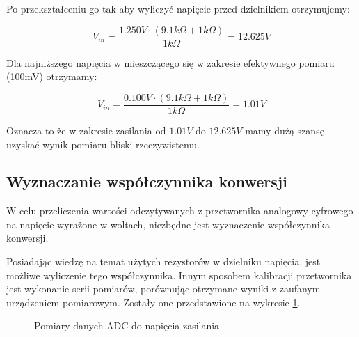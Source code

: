         Po przekształceniu go tak aby wyliczyć napięcie przed dzielnikiem otrzymujemy:
        
        \vspace{1em}
        \begin{displaymath}
         V_{in} = \frac{ 1.250V \cdot (9.1k \Omega  + 1k \Omega)  }{ 1k \Omega  } = 12.625 V
        \end{displaymath}
        \vspace{1em}
        
        Dla najniższego napięcia w mieszczącego się w zakresie efektywnego pomiaru (100mV) otrzymamy:
        
        \vspace{1em}
        \begin{displaymath}
         V_{in} = \frac{ 0.100V \cdot (9.1k \Omega  + 1k \Omega)  }{ 1k \Omega  } = 1.01 V
        \end{displaymath}      
        \vspace{1em}
        
        Oznacza to że w zakresie zasilania od $1.01V$ do $12.625V$ mamy dużą szansę uzyskać wynik pomiaru bliski rzeczywistemu.
        
    \newpage
        
    \subsection{Wyznaczanie współczynnika konwersji}
        W celu przeliczenia wartości odczytywanych z przetwornika analogowy-cyfrowego na napięcie wyrażone w woltach, niezbędne jest wyznaczenie współczynnika konwersji. 
        
        Posiadając wiedzę na temat użytych rezystorów w dzielniku napięcia, jest możliwe wyliczenie tego współczynnika. Innym sposobem kalibracji przetwornika jest wykonanie serii pomiarów, porównując otrzymane wyniki z zaufanym urządzeniem pomiarowym. Zostały one przedstawione na wykresie \ref{fig:adc_plot}.
 
        \begin{figure}
        \vspace{1em}
            \centering
            \caption{Pomiary danych ADC do napięcia zasilania}
            \label{fig:adc_plot}
        \end{figure}
        \vspace{1em}
        
